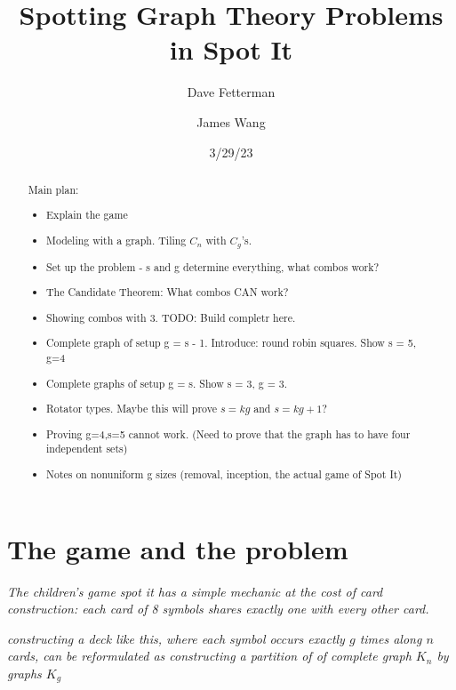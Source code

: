 \documentclass[11pt, oneside]{article} 	%
\title{Spotting Graph Theory Problems in Spot It}
\author[1]{Dave Fetterman}
\author[2]{James Wang}
\affil[1]{Obviously Unemployed}
\affil[2]{Surprisingly Employed}
\date{3/29/23}
\begin{document}
\maketitle

\begin{abstract}

Main plan:
\begin{itemize}
\item Explain the game
\item Modeling with a graph.  Tiling $C_n$ with $C_g$'s.
\item Set up the problem - s and g determine everything, what combos work?
\item The Candidate Theorem: What combos CAN work?
\item Showing combos with 3.  TODO: Build completr here.
\item Complete graph of setup  g = s - 1.  Introduce: round robin squares.  Show s = 5, g=4
\item Complete graphs of setup g = s.  Show s = 3, g = 3.
\item Rotator types.  Maybe this will prove $s=kg$ and $s=kg+1$?
\item Proving g=4,s=5 cannot work. (Need to prove that the graph has to have four independent sets)
\item Notes on nonuniform g sizes (removal, inception, the actual game of Spot It)
\end{itemize}

\end{abstract}

\section{The game and the problem}
\emph{The children's game spot it has a simple mechanic at the cost of card construction: each card of 8 symbols shares exactly one with every other card.}

\emph{constructing a deck like this, where each symbol occurs exactly $g$ times along $n$ cards, can be reformulated as constructing a partition of of complete graph $K_n$ by graphs $K_g$}
\end{document}
